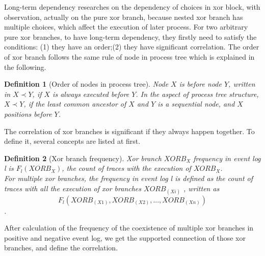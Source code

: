 \documentclass[]{article}
\newtheorem{mydef}{Definition}[section]
\begin{document}

Long-term dependency researches on the dependency of choices in xor block, with observation, actually on the pure xor branch, because nested xor branch has multiple choices, which affect the execution of later process. For two arbitrary pure xor branches, to have long-term dependency, they firstly need to satisfy the conditions: (1) they have an order;(2) they have significant correlation.
The order of xor branch follows the same rule of node in process tree which is explained in the following.
\begin{mydef}[Order of nodes in process tree]
	Node $X$ is before node $Y$, written in $X \prec Y$, if $X$ is always executed before $Y$.  In the aspect of process tree structure, $X \prec Y$, if the least common ancestor of $X$ and $Y$ is a sequential node, and $X$ positions before $Y$.
\end{mydef} 
The correlation of xor branches is significant if they always happen together. To define it, several concepts are listed at first. 
\begin{mydef}[Xor branch frequency]
	Xor branch $XORB_X$ frequency in event log l is $F_{l}(XORB_X)$, the count of traces with the execution of $XORB_X$. \\
	For multiple xor branches, the frequency in event log l is defined as the count of traces with all the execution of xor branches $XORB_(Xi)$ , written as \[F_{l}(XORB_(X1), XORB_(X2),...,XORB_(Xn))\].
\end{mydef}
After calculation of the frequency of the coexistence of multiple xor branches in positive and negative event log, we get the supported connection of those xor branches, and define the correlation. 
\end{document}

